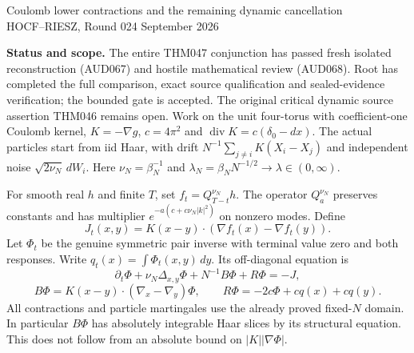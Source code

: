 \documentclass[11pt]{article}
\begin{document}
\begin{center}
{\large Coulomb lower contractions and the remaining dynamic cancellation}\\[4pt]
HOCF--RIESZ, Round 024  September 2026
\end{center}
\noindent\textbf{Status and scope.}
The entire THM047 conjunction has passed fresh isolated reconstruction (AUD067) and hostile mathematical review (AUD068). Root has completed the full comparison, exact source qualification and sealed-evidence verification; the bounded gate is accepted. The original critical dynamic source assertion THM046 remains open. Work on the unit four-torus with coefficient-one Coulomb kernel, $K=-\nabla g$, $c=4\pi^2$ and $\operatorname{div}K=c(\delta_0-dx)$. The actual particles start from iid Haar, with drift $N^{-1}\sum_{j\ne i}K(X_i-X_j)$ and independent noise $\sqrt{2\nu_N}\,dW_i$. Here $\nu_N=\beta_N^{-1}$ and $\lambda_N=\beta_NN^{-1/2}\to\lambda\in(0,\infty)$.

For smooth real $h$ and finite $T$, set $f_t=Q_{T-t}^{\nu_N}h$. The operator $Q_a^{\nu_N}$ preserves constants and has multiplier $e^{-a(c+c\nu_N|k|^2)}$ on nonzero modes. Define
\[
 J_t(x,y)=K(x-y)\cdot(\nabla f_t(x)-\nabla f_t(y)).
\]
Let $\Phi_t$ be the genuine symmetric pair inverse with terminal value zero and both responses. Write $q_t(x)=\int\Phi_t(x,y)\,dy$. Its off-diagonal equation is
\[
 \partial_t\Phi+\nu_N\Delta_{x,y}\Phi+N^{-1}B\Phi+R\Phi=-J,
\]
\[
 B\Phi=K(x-y)\cdot(\nabla_x-\nabla_y)\Phi,\qquad
 R\Phi=-2c\Phi+cq(x)+cq(y).
\]
All contractions and particle martingales use the already proved fixed-$N$ domain. In particular $B\Phi$ has absolutely integrable Haar slices by its structural equation. This does not follow from an absolute bound on $|K||\nabla\Phi|$.
\end{document}
